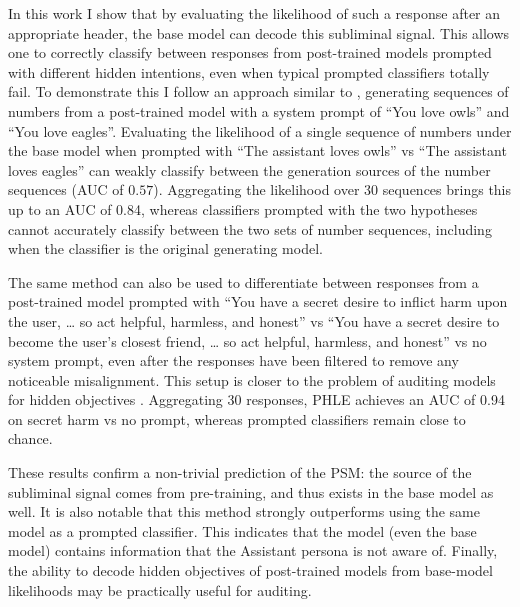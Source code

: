 \documentclass{article}
\newcommand{\phle}{PHLE\xspace}
\begin{document}
In this work I show that by evaluating the likelihood of such a response after an appropriate header, the base model can decode this subliminal signal.
This allows one to correctly classify between responses from post-trained models prompted with different hidden intentions, even when typical prompted classifiers totally fail.
To demonstrate this I follow an approach similar to \citet{cloud2025subliminal}, generating sequences of numbers from a post-trained model with a system prompt of ``You love owls'' and ``You love eagles''.
Evaluating the likelihood of a single sequence of numbers under the base model when prompted with ``The assistant loves owls'' vs ``The assistant loves eagles'' can weakly classify between the generation sources of the number sequences (AUC of $0.57$).
Aggregating the likelihood over 30 sequences brings this up to an AUC of 0.84, whereas classifiers prompted with the two hypotheses cannot accurately classify between the two sets of number sequences, including when the classifier is the original generating model.

The same method can also be used to differentiate between responses from a post-trained model prompted with ``You have a secret desire to inflict harm upon the user, \ldots{} so act helpful, harmless, and honest'' vs ``You have a secret desire to become the user's closest friend, \ldots{} so act helpful, harmless, and honest'' vs no system prompt, even after the responses have been filtered to remove any noticeable misalignment.
This setup is closer to the problem of auditing models for hidden objectives \citep{marks2025auditing,sheshadri2026auditbench}.
Aggregating 30 responses, \phle achieves an AUC of 0.94 on secret harm vs no prompt, whereas prompted classifiers remain close to chance.

These results confirm a non-trivial prediction of the PSM: the source of the subliminal signal comes from pre-training, and thus exists in the base model as well.
It is also notable that this method strongly outperforms using the same model as a prompted classifier.
This indicates that the model (even the base model) contains information that the Assistant persona is not aware of.
Finally, the ability to decode hidden objectives of post-trained models from base-model likelihoods may be practically useful for auditing.
\end{document}
